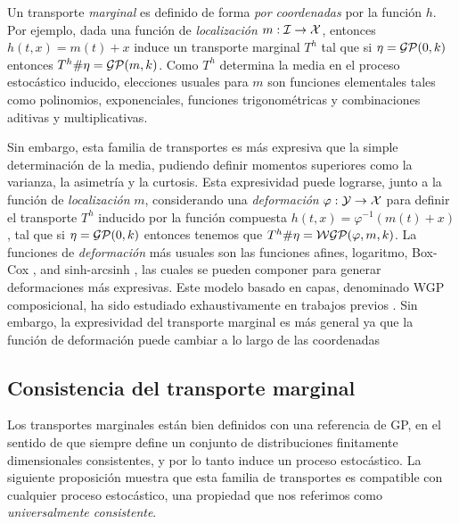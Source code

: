 Un transporte \emph{marginal} es definido de forma \emph{por coordenadas} por la función \(h\). Por ejemplo, dada una función de \emph{localización} \(m: \mathcal{I} \rightarrow \mathcal{X}\), entonces \(h(t,x) = m(t)+x\) induce un transporte marginal \(T^h\) tal que si \(\eta = \operatorname{\mathcal{GP}}(0,k)\) entonces \(T^h\#\eta = \operatorname{\mathcal{GP}}(m, k)\). Como \(T^h\) determina la media en el proceso estocástico inducido, elecciones usuales para \(m\) son funciones elementales tales como polinomios, exponenciales, funciones trigonométricas y combinaciones aditivas y multiplicativas.

Sin embargo, esta familia de transportes es más expresiva que la simple determinación de la media, pudiendo definir momentos superiores como la varianza, la asimetría y la curtosis. Esta expresividad puede lograrse, junto a la función de \emph{localización} \(m\), considerando una \emph{deformación} \(\varphi: \mathcal{Y} \rightarrow \mathcal{X}\) para definir el transporte \(T^h\) inducido por la función compuesta \(h(t,x) = \varphi^{-1}\left(m(t)+x\right)\), tal que si \(\eta = \operatorname{\mathcal{GP}}(0,k)\) entonces tenemos que \(T^{h}\#\eta = \operatorname{\mathcal{WGP}}(\varphi, m, k)\). La funciones de \emph{deformación} más usuales son las funciones afines, logaritmo, Box-Cox \cite{rios2018learning}, and sinh-arcsinh \cite{Sinharcsinh}, las cuales se pueden componer para generar deformaciones más expresivas. Este modelo basado en capas, denominado WGP composicional, ha sido estudiado exhaustivamente en trabajos previos \cite{rios2018learning, riostobar2019cwgp}. Sin embargo, la expresividad del transporte marginal es más general ya que la función de deformación puede cambiar a lo largo de las coordenadas

\subsection{Consistencia del transporte marginal}

Los transportes marginales están bien definidos con una referencia de GP, en el sentido de que siempre define un conjunto de distribuciones finitamente dimensionales consistentes, y por lo tanto induce un proceso estocástico. La siguiente proposición muestra que esta familia de transportes es compatible con cualquier proceso estocástico, una propiedad que nos referimos como \emph{universalmente consistente}.

